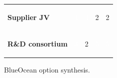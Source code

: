 \documentclass[10pt,a4paper]{article}
\begin{document}
{\begin{tabular}{p{38mm}>{\centering\arraybackslash}p{21mm}>{\centering\arraybackslash}p{21mm}>{\centering\arraybackslash}p{21mm}>{\centering\arraybackslash}p{21mm}}
{\bfseries Supplier JV} & \colorbox{BOGreen}{\textcolor{white}{\strut\hspace{5pt}4\hspace{5pt}}} & \colorbox{BOGreen}{\textcolor{white}{\strut\hspace{5pt}4\hspace{5pt}}} & \colorbox{BOLight}{\textcolor{BOText}{\strut\hspace{5pt}2\hspace{5pt}}} & \colorbox{BOLight}{\textcolor{BOText}{\strut\hspace{5pt}2\hspace{5pt}}} \\
{\bfseries R\&D consortium} & \colorbox{BOBlue}{\textcolor{white}{\strut\hspace{5pt}3\hspace{5pt}}} & \colorbox{BOLight}{\textcolor{BOText}{\strut\hspace{5pt}2\hspace{5pt}}} & \colorbox{BOGreen}{\textcolor{white}{\strut\hspace{5pt}5\hspace{5pt}}} & \colorbox{BOGreen}{\textcolor{white}{\strut\hspace{5pt}5\hspace{5pt}}} \\
\end{tabular}}\par\vspace{2pt}
\par
{\scriptsize\color{BOMuted} BlueOcean option synthesis.}\par
\end{document}
